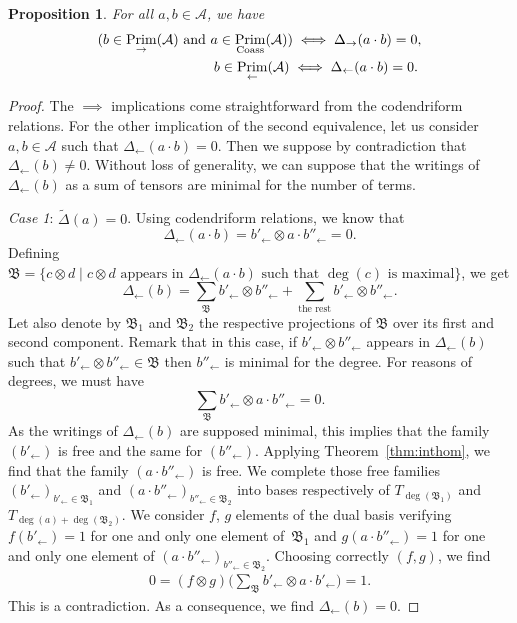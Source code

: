 \documentclass[pdftex]{sigma}
\numberwithin{equation}{section}
\theoremstyle{definition}
\theoremstyle{plain}
\newtheorem{Prop}[defi]{Proposition}
\DeclareMathOperator{\Prim}{Prim}
\begin{document}
\begin{Prop}
	For all $a,b\in \mathcal{A}$, we have
	\begin{gather*}
	(b\in\Prim_{\rightarrow}(\mathcal{A}) \  \text{\normalfont and} \  a\in\Prim_{\rm Coass}(\mathcal{A})) \iff \Delta_{\rightarrow}(a\cdot b)=0, \\
	\hphantom{(b\in\Prim_{\rightarrow}(\mathcal{A})\  \text{\normalfont and} \ }{} b\in\Prim_{\leftarrow}(\mathcal{A}) \iff \Delta_{\leftarrow}(a\cdot b)=0.
	\end{gather*}
\end{Prop}
\begin{proof}
	The $\implies$ implications come straightforward from the codendriform relations.
	For the other implication of the second equivalence, let us consider $a,b\in \mathcal{A}$ such that $\Delta_{\leftarrow}(a\cdot b)=0$.
	Then we suppose by contradiction that $\Delta_{\leftarrow}(b)\neq 0$. Without loss of generality, we can suppose that the writings of $\Delta_{\leftarrow}(b)$ as a sum of tensors are minimal for the number of terms.
	
	\textit{Case 1}: $\tilde{\Delta}(a)=0$.
	Using codendriform relations, we know that
	\[
	\Delta_{\leftarrow}(a\cdot b)=b'_{\leftarrow}\otimes a\cdot b''_{\leftarrow}=0.
	\]
	Defining $\mathfrak{B}=\{ c\otimes d \mid c\otimes d \text{ appears in } \Delta_{\leftarrow}(a\cdot b) \text{ such that } \deg(c) \text{ is maximal}\}$, we get
	\[
	\Delta_{\leftarrow}(b)=\sum_{\mathfrak{B}} b'_{\leftarrow}\otimes b''_{\leftarrow}+\sum_{\text{the rest}} b'_{\leftarrow}\otimes b''_{\leftarrow}.
	\]
	Let also denote by $\mathfrak{B}_1$ and $\mathfrak{B}_2$ the respective projections of $\mathfrak{B}$ over its first and second component. Remark that in this case, if $b'_{\leftarrow}\otimes b''_{\leftarrow}$ appears in $\Delta_{\leftarrow}(b)$ such that $b'_{\leftarrow}\otimes b''_{\leftarrow}\in\mathfrak{B}$ then $b''_{\leftarrow}$ is minimal for the degree. For reasons of degrees, we must have
	\[
	\sum_{\mathfrak{B}} b'_{\leftarrow}\otimes a\cdot b''_{\leftarrow}=0.
	\]
	As the writings of $\Delta_{\leftarrow}(b)$ are supposed minimal, this implies that the family $(b'_{\leftarrow})$ is free and the same for $(b''_{\leftarrow})$.
Applying Theorem~\ref{thm:inthom}, we find that the family $(a\cdot b''_{\leftarrow})$ is free.
We complete those free families $(b'_{\leftarrow})_{b'_{\leftarrow}\in\mathfrak{B}_1}$ and $(a\cdot b''_{\leftarrow})_{ b''_{\leftarrow}\in\mathfrak{B}_2}$ into bases respectively of $T_{\deg(\mathfrak{B}_1)}$ and $T_{\deg(a)+\deg(\mathfrak{B}_2)}$. We consider $f$, $g$ elements of the dual basis verifying $f(b'_{\leftarrow})=1$ for one and only one element of~$\mathfrak{B}_1$ and $g(a\cdot b''_{\leftarrow})=1$ for one and only one element of $(a\cdot b''_{\leftarrow})_{b''_{\leftarrow}\in\mathfrak{B}_2}$. Choosing correctly $(f,g)$, we find
	\begin{align*}
		0=(f\otimes g)\bigg( \sum_{\mathfrak{B}} b'_{\leftarrow}\otimes a\cdot b'_{\leftarrow} \bigg)=1.
	\end{align*}
	This is a contradiction. As a consequence, we find $\Delta_{\leftarrow}(b)=0$.
	

\end{proof}
\end{document}
